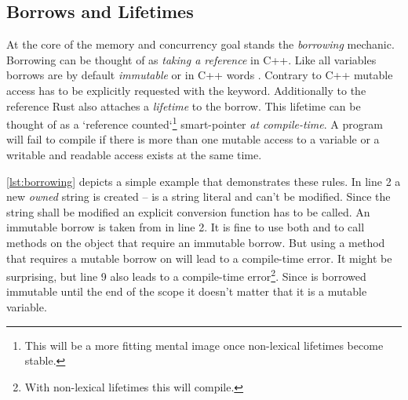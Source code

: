 \documentclass[thesis]{subfiles}
\begin{document}
  \subsection{Borrows and Lifetimes}\label{sec:rustBorr}
    At the core of the memory and concurrency goal stands the \emph{borrowing} mechanic.
    Borrowing can be thought of as \emph{taking a reference} in C++.
    Like all variables borrows are by default \emph{immutable} or in C++ words .
    Contrary to C++ mutable access has to be explicitly requested with the  keyword.
    Additionally to the reference Rust also attaches a \emph{lifetime} to the borrow.
    This lifetime can be thought of as a `reference counted`\footnote{%
      This will be a more fitting mental image once non-lexical lifetimes become stable.
    } smart-pointer \emph{at compile-time}.
    A program will fail to compile if there is more than one mutable access to a variable or a writable and readable access exists at the same time.

    

    \autoref{lst:borrowing} depicts a simple example that demonstrates these rules.
    In line 2 a new \emph{owned} string is created --  is a string literal and can't be modified.
    Since the string shall be modified an explicit conversion function has to be called.
    An immutable borrow is taken from  in line 2.
    It is fine to use both  and  to call methods on the object that require an immutable borrow.
    But using a method that requires a mutable borrow on  will lead to a compile-time error.
    It might be surprising, but line 9 also leads to a compile-time error\footnote{%
      With non-lexical lifetimes this will compile.
    }.
    Since  is borrowed immutable until the end of the scope it doesn't matter that it is a mutable variable.

    \newsavebox{\lifetimeErrBox}
    \begin{lrbox}{\lifetimeErrBox}%
      \begin{minipage}{.45\linewidth}
        
      \end{minipage}
    \end{lrbox}
\end{document}
